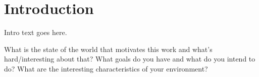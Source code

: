 \section{Introduction}

Intro text goes here.

What is the state of the world that motivates this work and what's hard/interesting about that?  What goals do you have and what do you intend to do?  What are the interesting characteristics of your environment?
